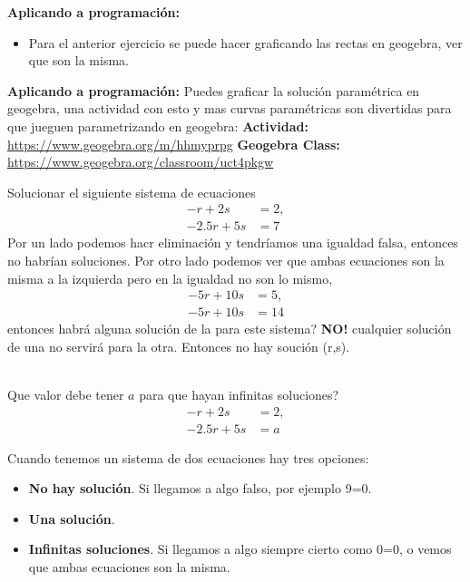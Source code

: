 \begin{tcolorbox}[colback=black!5!white,colframe=black]
	\textbf{Aplicando a programación:}
	\begin{itemize}
		\item Para el anterior ejercicio se puede hacer graficando las rectas en geogebra, ver que son la misma.		
	\end{itemize}
\end{tcolorbox}

\begin{tcolorbox}[colback=black!5!white,colframe=black]
	\textbf{Aplicando a programación:} Puedes graficar la solución paramétrica en geogebra, una actividad con esto y mas curvas paramétricas son divertidas para que jueguen parametrizando en geogebra: \textbf{Actividad:} \url{https://www.geogebra.org/m/hhmyprpg} \textbf{Geogebra Class: }\url{https://www.geogebra.org/classroom/uct4pkgw}
\end{tcolorbox}

\begin{ejemplo}
	Solucionar el siguiente sistema de ecuaciones
	\begin{align*}
	-r+2s &= 2, \\
	-2.5r+5s &= 7
	\end{align*}
	Por un lado podemos hacr eliminación y tendríamos una igualdad falsa, entonces no habrían soluciones. Por otro lado podemos ver que ambas ecuaciones son la misma a la izquierda pero en la igualdad no son lo mismo, 
	\begin{align*}
	-5r+10s &= 5, \\
	-5r+10s &= 14
	\end{align*}
	entonces habrá alguna solución de la para este sistema? \textbf{NO!} cualquier solución de una no servirá para la otra. Entonces no hay soución (r,s).
\end{ejemplo}

\begin{exer}{\ \\}
Que valor debe tener $a$ para que hayan infinitas soluciones?
\begin{align*}
-r+2s &= 2, \\
-2.5r+5s &= a
\end{align*}
\end{exer}

\begin{tcolorbox}[colback=red!5!white,colframe=red!75!black]
	Cuando tenemos un sistema de dos ecuaciones hay tres opciones:
	\begin{itemize}
		\item \textbf{No hay solución}. Si llegamos a algo falso, por ejemplo 9=0.
		
		\item \textbf{Una solución}. 
		
		\item \textbf{Infinitas soluciones}. Si llegamos a algo siempre cierto como 0=0, o vemos que ambas ecuaciones son la misma.
	\end{itemize}
\end{tcolorbox}


